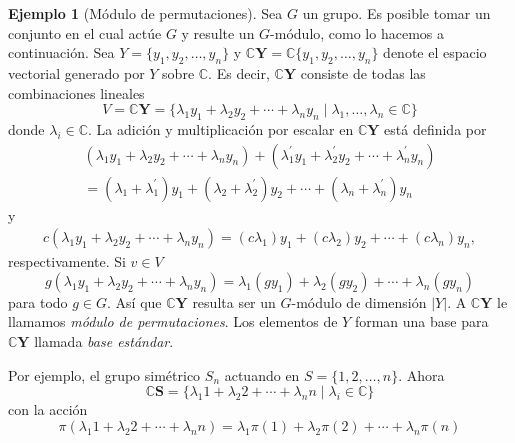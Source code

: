 \documentclass[12pt]{book}
\theoremstyle{definition}
\newtheorem{example}[theorem]{Ejemplo}
\newcounter{in}
\newcounter{ini}
\begin{document}
\begin{example}[Módulo de permutaciones]
  \label{CS}
  Sea $G$ un grupo. Es posible tomar un conjunto en el cual actúe $G$
  y resulte un $G$-módulo, como lo hacemos a continuación. Sea
  $Y=\{y_{1},y_{2},\ldots,y_{n}\}$ y $\mathbb{C}\boldsymbol{Y}=\mathbb{C}\{y_{1},y_{2},\ldots,y_{n}\}$ denote el
  espacio vectorial generado por $Y$ sobre $\mathbb{C}$. Es decir,
  $\mathbb{C}\boldsymbol{Y}$ consiste de todas las combinaciones lineales
  \begin{equation*}
    V=\mathbb{C}\boldsymbol{Y}=\{\lambda_{1}y_{1}+\lambda_{2}y_{2}+\cdots
    +\lambda_{n}y_{n}\mid\lambda_{1},\ldots,\lambda_{n}\in \mathbb{C}\}
  \end{equation*}
  donde $\lambda_{i}\in\mathbb{C}$. La adición y multiplicación por escalar
  en $\mathbb{C}\boldsymbol{Y}$ está definida por
  \begin{eqnarray*}
    (\lambda_{1}y_{1}+\lambda_{2}y_{2}+\cdots
    +\lambda_{n}y_{n})+(\lambda^{'}_{1}y_{1}+\lambda^{'}_{2}y_{2}+\cdots +\lambda^{'}_{n}y_{n})\\
    =(\lambda_{1}+\lambda^{'}_{1})y_{1}+(\lambda_{2}+\lambda^{'}_{2})y_{2}+\cdots
    +(\lambda_{n}+\lambda^{'}_{n})y_{n}
  \end{eqnarray*}
  y
  \begin{eqnarray*}
    c(\lambda_{1}y_{1}+\lambda_{2}y_{2}+\cdots +\lambda_{n}y_{n})=(c\lambda_{1})y_{1}+(c\lambda_{2})y_{2}+\cdots +(c\lambda_{n})y_{n},
  \end{eqnarray*}
  respectivamente. Si $v\in V$
  \begin{equation*}
    g(\lambda_{1}y_{1}+\lambda_{2}y_{2}+\cdots +\lambda_{n}y_{n})=\lambda_{1}(gy_{1})+\lambda_{2}(gy_{2})+\cdots +\lambda_{n}(gy_{n})
  \end{equation*}
  para todo $g\in G$. Así que $\mathbb{C}\boldsymbol{Y}$ resulta ser un $G$-módulo
  de dimensión $|Y|$. A $\mathbb{C}\boldsymbol{Y}$ le llamamos
  \emph{módulo de permutaciones}. Los elementos de
  $Y$ forman una base para $\mathbb{C}\boldsymbol{Y}$ llamada
  \emph{base estándar}.

  Por ejemplo, el grupo simétrico $S_{n}$ actuando en $S=\{1,2,\ldots,n\}$. Ahora
  \begin{equation*}
    \mathbb{C}\boldsymbol{S}=\{\lambda_{1}1+\lambda_{2}2+\cdots+\lambda_{n}n\mid \lambda_{i}\in\mathbb{C}\}
  \end{equation*}
  con la acción
  \begin{equation*}
    \pi(\lambda_{1}1+\lambda_{2}2+\cdots+\lambda_{n}n)=\lambda_{1}\pi(1)+\lambda_{2}\pi(2)+\cdots+\lambda_{n}\pi(n)
  \end{equation*}


\end{example}
\end{document}
